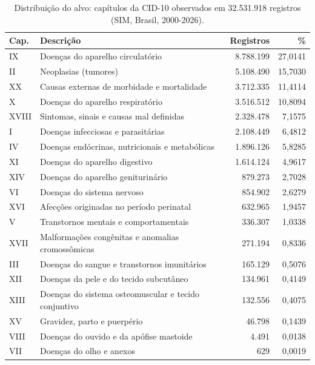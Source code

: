 \documentclass[12pt]{article}
\begin{document}
\begin{table}[ht]
\centering
\caption{Distribuição do alvo: capítulos da CID-10 observados em 32.531.918 registros (SIM, Brasil, 2000-2026).}
\label{tab:classes}
\begin{tabular}{|l|l|r|r|}
\hline
\textbf{Cap.} & \textbf{Descrição} & \textbf{Registros} & \textbf{\%} \\
\hline
IX    & Doenças do aparelho circulatório                       & 8.788.199 & 27,0141 \\
II    & Neoplasias (tumores)                                   & 5.108.490 & 15,7030 \\
XX    & Causas externas de morbidade e mortalidade             & 3.712.335 & 11,4114 \\
X     & Doenças do aparelho respiratório                       & 3.516.512 & 10,8094 \\
XVIII & Sintomas, sinais e causas mal definidas                & 2.328.478 &  7,1575 \\
I     & Doenças infecciosas e parasitárias                     & 2.108.449 &  6,4812 \\
IV    & Doenças endócrinas, nutricionais e metabólicas         & 1.896.126 &  5,8285 \\
XI    & Doenças do aparelho digestivo                          & 1.614.124 &  4,9617 \\
XIV   & Doenças do aparelho geniturinário                      &   879.273 &  2,7028 \\
VI    & Doenças do sistema nervoso                             &   854.902 &  2,6279 \\
XVI   & Afecções originadas no período perinatal               &   632.965 &  1,9457 \\
V     & Transtornos mentais e comportamentais                  &   336.307 &  1,0338 \\
XVII  & Malformações congênitas e anomalias cromossômicas      &   271.194 &  0,8336 \\
III   & Doenças do sangue e transtornos imunitários            &   165.129 &  0,5076 \\
XII   & Doenças da pele e do tecido subcutâneo                 &   134.961 &  0,4149 \\
XIII  & Doenças do sistema osteomuscular e tecido conjuntivo   &   132.556 &  0,4075 \\
XV    & Gravidez, parto e puerpério                            &    46.798 &  0,1439 \\
VIII  & Doenças do ouvido e da apófise mastoide                &     4.491 &  0,0138 \\
VII   & Doenças do olho e anexos                               &       629 &  0,0019 \\
\hline
\end{tabular}
\end{table}
\end{document}

